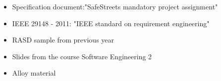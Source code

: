 \begin{itemize}
	\item
	Specification document:"SafeStreets mandatory project assignment"
	\item
	IEEE 29148 - 2011: "IEEE standard on requirement engineering"
	\item 
	RASD sample from previous year
	\item 
	Slides from the course Software Engineering 2
	\item 
	Alloy material
\end{itemize}